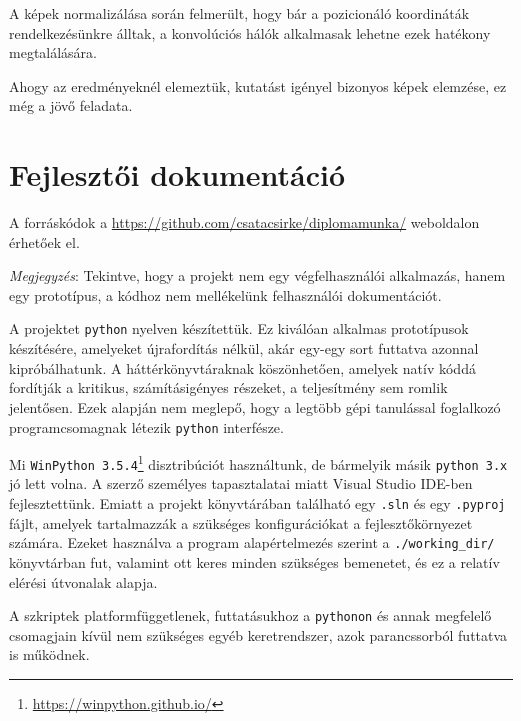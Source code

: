 A képek normalizálása során felmerült, hogy bár a pozicionáló koordináták rendelkezésünkre 
álltak, a konvolúciós hálók alkalmasak lehetne ezek hatékony megtalálására.


Ahogy az eredményeknél elemeztük, kutatást igényel bizonyos képek elemzése,
ez még a jövő feladata.

%
%
%
%
%
%
%


\newpage
\section{Fejlesztői dokumentáció}

A forráskódok a \url{https://github.com/csatacsirke/diplomamunka/} weboldalon érhetőek el.


\textit{Megjegyzés}: Tekintve, hogy a projekt nem egy végfelhasználói alkalmazás, hanem 
egy prototípus, a kódhoz nem mellékelünk felhasználói dokumentációt.


A projektet \texttt{python} nyelven készítettük. Ez kiválóan alkalmas prototípusok készítésére, amelyeket újrafordítás nélkül, akár egy-egy sort futtatva azonnal kipróbálhatunk. A  háttérkönyvtáraknak köszönhetően, amelyek natív kóddá fordítják a kritikus, számításigényes részeket, a  teljesítmény sem romlik jelentősen. Ezek alapján nem meglepő, hogy a legtöbb gépi tanulással foglalkozó programcsomagnak létezik \texttt{python} interfésze.


Mi \texttt{WinPython 3.5.4}\footnote{\url{https://winpython.github.io/}} disztribúciót használtunk, de bármelyik másik \texttt{python 3.x} jó lett volna. A szerző személyes tapasztalatai miatt Visual Studio IDE-ben fejlesztettünk. Emiatt a projekt könyvtárában található egy \texttt{.sln} és egy \texttt{.pyproj} fájlt, amelyek tartalmazzák a szükséges konfigurációkat a fejlesztőkörnyezet számára. Ezeket használva a program alapértelmezés szerint a \texttt{./working\_dir/} könyvtárban fut, valamint ott keres minden szükséges bemenetet, és ez a relatív elérési útvonalak alapja.


A szkriptek platformfüggetlenek, futtatásukhoz a \texttt{pythonon} és annak megfelelő csomagjain 
kívül nem szükséges egyéb keretrendszer, azok parancssorból futtatva is működnek.


